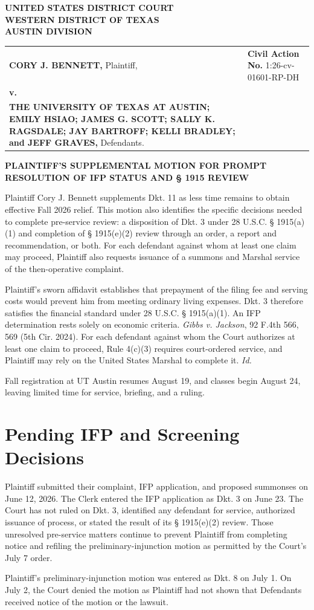 \documentclass[12pt]{article}
\makeatletter
\providecommand{\FilingCourtName}{UNITED STATES DISTRICT COURT}
\providecommand{\FilingDistrictName}{WESTERN DISTRICT OF TEXAS}
\providecommand{\FilingDivisionName}{AUSTIN DIVISION}
\providecommand{\FilingPlaintiffNameUpper}{CORY J. BENNETT}
\providecommand{\FilingDefendantsInlineUpper}{THE UNIVERSITY OF TEXAS AT AUSTIN; EMILY HSIAO; JAMES G. SCOTT; SALLY K. RAGSDALE; JAY BARTROFF; KELLI BRADLEY; and JEFF GRAVES}
\providecommand{\FilingCivilActionNumber}{}
\renewcommand{\FilingCivilActionNumber}{1:26-cv-01601-RP-DH}
\newcommand{\Caption}{%
  \begin{singlespace}
  \begin{center}
  \textbf{\FilingCourtName}\\
  \textbf{\FilingDistrictName}\\
  \textbf{\FilingDivisionName}
  \end{center}

  \vspace{0.45em}

  \noindent
  \begin{tabularx}{\textwidth}{@{}>{\raggedright\arraybackslash}X>{\raggedright\arraybackslash}p{2.95in}@{}}
  \textbf{\FilingPlaintiffNameUpper,} Plaintiff, & \textbf{Civil Action No.} \FilingCivilActionNumber \\
  \textbf{v.} & \\
  \textbf{\FilingDefendantsInlineUpper,} Defendants. & \\
  \end{tabularx}

  \vspace{1.0em}
  \end{singlespace}%
}
\makeatother
\begin{document}
\Caption

\begin{singlespace}
\begin{center}
\textbf{PLAINTIFF'S SUPPLEMENTAL MOTION FOR PROMPT RESOLUTION OF IFP STATUS AND § 1915 REVIEW}
\end{center}
\end{singlespace}

Plaintiff Cory J. Bennett supplements Dkt. 11 as less time remains to obtain effective Fall 2026 relief. This motion also identifies the specific decisions needed to complete pre-service review: a disposition of Dkt. 3 under 28 U.S.C. § 1915(a)(1) and completion of § 1915(e)(2) review through an order, a report and recommendation, or both. For each defendant against whom at least one claim may proceed, Plaintiff also requests issuance of a summons and Marshal service of the then-operative complaint.

Plaintiff's sworn affidavit establishes that prepayment of the filing fee and serving costs would prevent him from meeting ordinary living expenses. Dkt. 3 therefore satisfies the financial standard under 28 U.S.C. § 1915(a)(1). An IFP determination rests solely on economic criteria. \textit{Gibbs v. Jackson}, 92 F.4th 566, 569 (5th Cir. 2024). For each defendant against whom the Court authorizes at least one claim to proceed, Rule 4(c)(3) requires court-ordered service, and Plaintiff may rely on the United States Marshal to complete it. \textit{Id.}

Fall registration at UT Austin resumes August 19, and classes begin August 24, leaving limited time for service, briefing, and a ruling.

\section*{Pending IFP and Screening Decisions}

Plaintiff submitted their complaint, IFP application, and proposed summonses on June 12, 2026. The Clerk entered the IFP application as Dkt. 3 on June 23. The Court has not ruled on Dkt. 3, identified any defendant for service, authorized issuance of process, or stated the result of its § 1915(e)(2) review. Those unresolved pre-service matters continue to prevent Plaintiff from completing notice and refiling the preliminary-injunction motion as permitted by the Court's July 7 order.

Plaintiff's preliminary-injunction motion was entered as Dkt. 8 on July 1. On July 2, the Court denied the motion as Plaintiff had not shown that Defendants received notice of the motion or the lawsuit.
\end{document}
